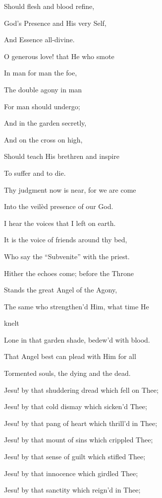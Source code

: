 Should flesh and blood refine,

God's
Presence and His very Self,

And Essence all-divine.

O
generous love! that He who smote

In man for man the foe,

The
double agony in man

For man should undergo;

And in
the garden secretly,

And on the cross on high,

Should
teach His brethren and inspire

To suffer and to die.


Thy judgment now is near, for we are come

Into the veilèd presence of our God.


I hear the voices that I left on earth.


It is the voice of friends around thy bed,

Who say the ``Subvenite'' with the priest.

Hither the echoes come; before the Throne

Stands the great Angel of the Agony,

The same who strengthen'd Him, what time He

knelt

Lone in that garden shade, bedew'd with blood.

That Angel best can plead with Him for all

Tormented souls, the dying and the dead.


Jesu! by that shuddering dread which fell on Thee;

Jesu! by that cold dismay which sicken'd Thee;

Jesu! by that pang of heart which thrill'd in Thee;

Jesu! by that mount of sins which crippled Thee;

Jesu! by that sense of guilt which stifled Thee;

Jesu! by that innocence which girdled Thee;

Jesu! by that sanctity which reign'd in Thee;

